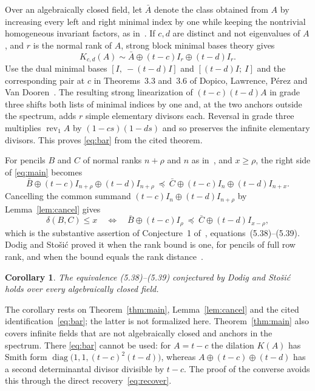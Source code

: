 \documentclass[11pt]{article}
\newtheorem{corollary}{Corollary}
\newcommand{\cmp}{\preceq}
\begin{document}
Over an algebraically closed field, let $\bar A$ denote the class obtained from $A$ by increasing every left and right minimal index by one while keeping the nontrivial homogeneous invariant factors, as in~\cite[Definition~2.1]{DS25}. If $c,d$ are distinct and not eigenvalues of $A$, and $r$ is the normal rank of $A$, strong block minimal bases theory gives
\begin{equation}\label{eq:bar}
K_{c,d}(A)\sim\bar A\oplus(t-c)I_r\oplus(t-d)I_r .
\end{equation}
Use the dual minimal bases $[I,\ -(t-d)I]$ and $[(t-d)I;\ I]$ and the corresponding pair at $c$ in Theorems~3.3 and~3.6 of Dopico, Lawrence, P\'erez and Van Dooren~\cite{DLPV18}. The resulting strong linearization of $(t-c)(t-d)A$ in grade three shifts both lists of minimal indices by one and, at the two anchors outside the spectrum, adds $r$ simple elementary divisors each. Reversal in grade three multiplies $\operatorname{rev}_1A$ by $(1-cs)(1-ds)$ and so preserves the infinite elementary divisors. This proves \eqref{eq:bar} from the cited theorem.

For pencils $B$ and $C$ of normal ranks $n+\rho$ and $n$ as in~\cite{DS25}, and $x\ge\rho$, the right side of \eqref{eq:main} becomes
\[
\bar B\oplus(t-c)I_{n+\rho}\oplus(t-d)I_{n+\rho}\ \cmp\ \bar C\oplus(t-c)I_n\oplus(t-d)I_{n+x}.
\]
Cancelling the common summand $(t-c)I_n\oplus(t-d)I_{n+\rho}$ by Lemma~\ref{lem:cancel} gives
\[
\delta(B,C)\le x\quad\Longleftrightarrow\quad \bar B\oplus(t-c)I_\rho\ \cmp\ \bar C\oplus(t-d)I_{x-\rho},
\]
which is the substantive assertion of Conjecture~1 of~\cite{DS25}, equations~(5.38)--(5.39). Dodig and Sto\v{s}i\'c proved it when the rank bound is one, for pencils of full row rank, and when the bound equals the rank distance~\cite{DS25}.

\begin{corollary}
The equivalence (5.38)--(5.39) conjectured by Dodig and Sto\v{s}i\'c~\cite[Conjecture~1]{DS25} holds over every algebraically closed field.
\end{corollary}

The corollary rests on Theorem~\ref{thm:main}, Lemma~\ref{lem:cancel} and the cited identification~\eqref{eq:bar}; the latter is not formalized here. Theorem~\ref{thm:main} also covers infinite fields that are not algebraically closed and anchors in the spectrum. There \eqref{eq:bar} cannot be used: for $A=t-c$ the dilation $K(A)$ has Smith form $\operatorname{diag}\bigl(1,1,(t-c)^2(t-d)\bigr)$, whereas $A\oplus(t-c)\oplus(t-d)$ has a second determinantal divisor divisible by $t-c$. The proof of the converse avoids this through the direct recovery~\eqref{eq:recover}.
\end{document}
